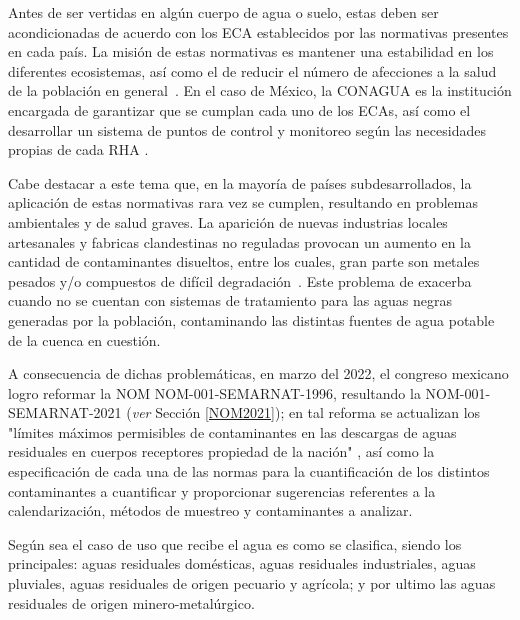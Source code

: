 Antes de ser vertidas en algún cuerpo de agua o suelo, estas deben ser acondicionadas de acuerdo con los \gls{ECA} establecidos por las normativas presentes en cada país. La misión de estas normativas es mantener una estabilidad en los diferentes ecosistemas, así como el de reducir el número de afecciones a la salud de la población en general~\citep{lazcano2016,martinez1999}. En el caso de México, la \gls{CONAGUA} es la institución encargada de garantizar que se cumplan cada uno de los \acrshort{ECA}s, así como el desarrollar un sistema de puntos de control y monitoreo según las necesidades propias de cada \gls{RHA} \citep{Ortiz2013}. \par
Cabe destacar a este tema que, en la mayoría de países subdesarrollados, la aplicación de estas normativas rara vez se cumplen, resultando en problemas ambientales y de salud graves. La aparición de nuevas industrias locales artesanales y fabricas clandestinas no reguladas provocan un aumento en la cantidad de contaminantes disueltos, entre los cuales, gran parte son metales pesados y/o compuestos de difícil degradación~\cite{metcalf2003}.
Este problema de exacerba cuando no se cuentan con sistemas de tratamiento para las aguas negras generadas por la población, contaminando las distintas fuentes de agua potable de la cuenca en cuestión.\par
A consecuencia de dichas problemáticas, en marzo del 2022, el congreso mexicano logro reformar la \gls{NOM} NOM-001-SEMARNAT-1996, resultando la NOM-001-SEMARNAT-2021 (\emph{ver} Sección \ref{NOM2021}); en tal reforma se actualizan los "límites máximos permisibles de contaminantes en las descargas de aguas residuales en cuerpos receptores propiedad de la nación" \citep{NOM2021}, así como la especificación de cada una de las normas para la cuantificación de los distintos contaminantes a cuantificar y proporcionar sugerencias referentes a la calendarización, métodos de muestreo y contaminantes a analizar.\par
Según sea el caso de uso que recibe el agua es como se clasifica, siendo los principales: aguas residuales domésticas, aguas residuales industriales, aguas pluviales, aguas residuales de origen pecuario y agrícola; y por ultimo las aguas residuales de origen minero-metalúrgico.\par
